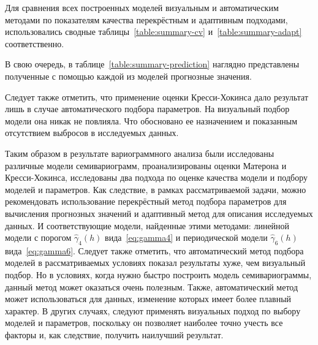 Для сравнения всех построенных моделей визуальным и автоматическим методами по показателям качества перекрёстным и адаптивным подходами, использовались сводные таблицы~\ref{table:summary-cv} и~\ref{table:summary-adapt} соответственно.





В свою очередь, в таблице~\ref{table:summary-prediction} наглядно представлены полученные с помощью каждой из моделей прогнозные значения.


Следует также отметить, что применение оценки Кресси-Хокинса дало результат лишь в случае автоматического подбора параметров. На визуальный подбор модели она никак не повлияла. Что обосновано ее назначением и показанным отсутствием выбросов в исследуемых данных.

Таким образом в результате вариограммного анализа были исследованы различные модели семивариограмм, проанализированы оценки Матерона и Кресси-Хокинса, исследованы два подхода по оценке качества модели и подбору моделей и параметров. Как следствие, в рамках рассматриваемой задачи, можно рекомендовать использование перекрёстный метод подбора параметров  для вычисления прогнозных значений и адаптивный метод для описания исследуемых данных. И соответствующие модели, найденные этими методами: линейной модели с порогом $ \widehat{\gamma}_4(h) $ вида~\eqref{eq:gamma4} и периодической модели $ \widehat{\gamma}_6(h) $ вида~\eqref{eq:gamma6}. Следует также отметить, что автоматический метод подбора моделей в рассматриваемых условиях показал результаты хуже, чем визуальный подбор. Но в условиях, когда нужно быстро построить модель семивариограммы, данный метод может оказаться очень полезным. Также, автоматический метод может использоваться для данных, изменение которых имеет более плавный характер. В других случаях, следуют применять визуальных подход по выбору моделей и параметров, поскольку он позволяет наиболее точно учесть все факторы и, как следствие, получить наилучший результат.


